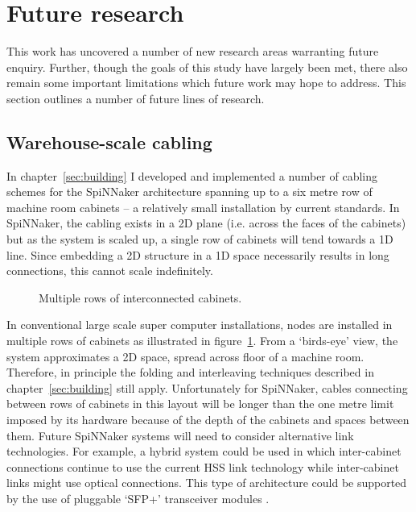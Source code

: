	\section{Future research}
		
		This work has uncovered a number of new research areas warranting future
		enquiry. Further, though the goals of this study have largely been met,
		there also remain some important limitations which future work may hope to
		address.  This section outlines a number of future lines of research.
		
		\subsection{Warehouse-scale cabling}
			
			In chapter~\ref{sec:building} I developed and implemented a number of
			cabling schemes for the SpiNNaker architecture spanning up to a six metre
			row of machine room cabinets -- a relatively small installation by
			current standards. In SpiNNaker, the cabling exists in a 2D plane (i.e.
			across the faces of the cabinets) but as the system is scaled up, a
			single row of cabinets will tend towards a 1D line. Since embedding a 2D
			structure in a 1D space necessarily results in long connections, this
			cannot scale indefinitely.
			
			\begin{figure}
				\center
				
				\caption{Multiple rows of interconnected cabinets.}
				\label{fig:multi-row-cabling}
			\end{figure}
			
			In conventional large scale super computer installations, nodes are
			installed in multiple rows of cabinets as illustrated in
			figure~\ref{fig:multi-row-cabling}.  From a `birds-eye' view, the system
			approximates a 2D space, spread across floor of a machine room.
			Therefore, in principle the folding and interleaving techniques described
			in chapter~\ref{sec:building} still apply. Unfortunately for SpiNNaker,
			cables connecting between rows of cabinets in this layout will be longer
			than the one metre limit imposed by its hardware because of the depth of
			the cabinets and spaces between them.  Future SpiNNaker systems will need
			to consider alternative link technologies.  For example, a hybrid system
			could be used in which inter-cabinet connections continue to use the
			current HSS link technology while inter-cabinet links might use optical
			connections. This type of architecture could be supported by the use of
			pluggable `SFP+' transceiver modules \cite{sff01}.
		
